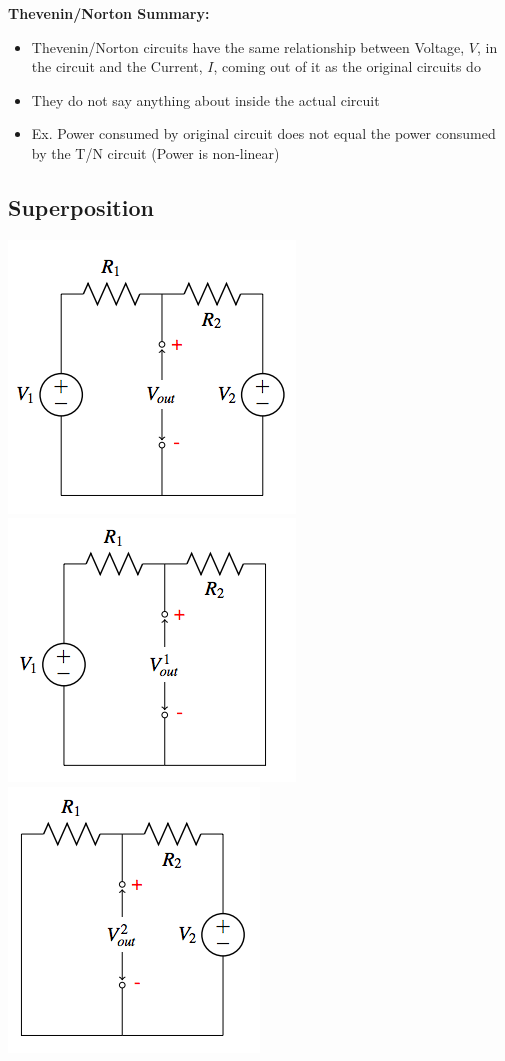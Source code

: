 \documentclass{article}\usepackage{amsmath,amssymb,amsthm,tikz,tkz-graph,color,chngpage,soul,hyperref,csquotes,graphicx,floatrow}\newcommand*{\QEDB}{\hfill\ensuremath{\square}}\newtheorem*{prop}{Proposition}\renewcommand{\theenumi}{\alph{enumi}}\usepackage[shortlabels]{enumitem}\usepackage[nobreak=true]{mdframed}\usetikzlibrary{matrix,calc}\MakeOuterQuote{"}\usepackage[margin=0.75in]{geometry} \newtheorem{theorem}{Theorem}
\begin{document}
\begin{mdframed}
\textbf{Thevenin/Norton Summary:}
\begin{itemize}
    \item Thevenin/Norton circuits have the same relationship between Voltage, $V$, in the circuit and the Current, $I$, coming out of it as the original circuits do
    \item They do not say anything about inside the actual circuit
    \item Ex. Power consumed by original circuit does not equal the power consumed by the T/N circuit (Power is non-linear)
\end{itemize}
\end{mdframed}

\subsection*{Superposition}
\begin{center}\includegraphics{spf}\includegraphics{sp1}\includegraphics{sp2}\end{center}
\end{document}
